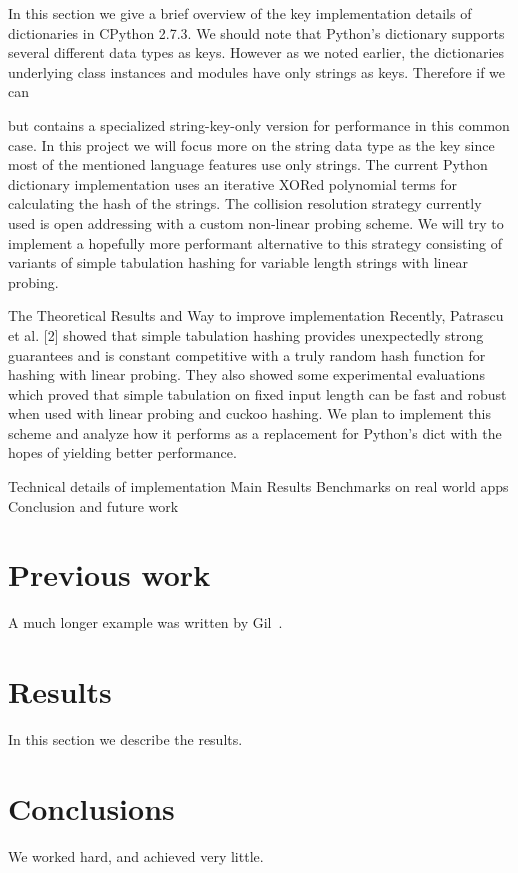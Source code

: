\documentclass[11pt]{article}
\begin{document}
In this section we give a brief overview of the key implementation details of dictionaries in CPython 2.7.3.
We should note that Python’s dictionary supports several different data types as keys. However as we noted earlier, the dictionaries underlying class instances and modules have only strings as keys. Therefore if we can 

 but contains a specialized string-key-only version for performance in this common case. In this project we will focus more on the string data type as the key since most of the mentioned language features use only strings. The current Python dictionary implementation uses an iterative XORed polynomial terms for calculating the hash of the strings. The collision resolution strategy currently used is open addressing with a custom non-linear probing scheme. We will try to implement a hopefully more performant alternative to this strategy consisting of variants of simple tabulation hashing for variable length strings with linear probing.

The Theoretical Results and Way to improve implementation
Recently, Patrascu et al. [2] showed that simple tabulation hashing provides unexpectedly strong guarantees and is constant competitive with a truly random hash function for hashing with linear probing. They also showed some experimental evaluations which proved that simple tabulation on fixed input length can be fast and robust when used with linear probing and cuckoo hashing.   We plan to implement this scheme and analyze how it performs as a replacement for Python’s dict with the hopes of yielding better performance.

Technical details of implementation
Main Results
Benchmarks on real world apps
Conclusion and future work




\section{Previous work}\label{previous work}
A much longer \LaTeXe{} example was written by Gil~\cite{Gil:02}.

\section{Results}\label{results}
In this section we describe the results.

\section{Conclusions}\label{conclusions}
We worked hard, and achieved very little.



\end{document}
